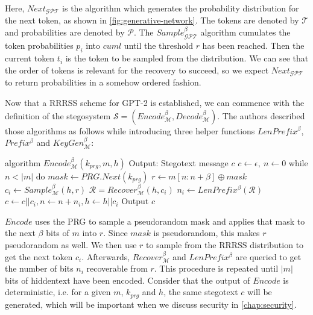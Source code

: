 Here, $Next_{\mathcal{GPT}}$ is the algorithm which generates the probability distribution for the next token, as shown in \autoref{fig:generative-network}.
The tokens are denoted by $\mathcal{T}$ and probabilities are denoted by $\mathcal{P}$.
The $Sample_{\mathcal{GPT}}^\beta$ algorithm cumulates the token probabilities $p_i$ into $cuml$ until the threshold $r$ has been reached.
Then the current token $t_i$ is the token to be sampled from the distribution.
We can see that the order of tokens is relevant for the recovery to succeed, so we expect $Next_{\mathcal{GPT}}$ to return probabilities in a somehow ordered fashion.

Now that a RRRSS scheme for GPT-2 is established, we can commence with the definition of the stegosystem $\mathcal{S} = \left( Encode_{\mathcal{M}}^\beta, Decode_{\mathcal{M}}^\beta \right)$.
The authors described those algorithms as follows while introducing three helper functions $LenPrefix^\beta$, $Prefix^\beta$ and $KeyGen_{\mathcal{M}}^\beta$:


\begin{Pseudocode}[caption={Meteor Encode Algorithm, \cite{Meteor2021}}, label={alg:encode}]
algorithm $Encode_{\mathcal{M}}^\beta(k_{prg}, m, h)$
	Output: Stegotext message $c$
	$c \leftarrow \epsilon,~ n \leftarrow 0$
	while $n < |m|$ do
		$mask \leftarrow PRG.Next(k_{prg})$
		$r \leftarrow m[n:n+\beta] \oplus mask$
		$c_i \leftarrow Sample_{\mathcal{M}}^\beta(h, r)$
		$\mathcal{R} = Recover_{\mathcal{M}}^\beta(h, c_i)$
		$n_i \leftarrow LenPrefix^\beta(\mathcal{R})$
		$c \leftarrow c || c_i, n \leftarrow n+n_i, h \leftarrow h||c_i$
	Output $c$
\end{Pseudocode}

$Encode$ uses the PRG to sample a pseudorandom mask and applies that mask to the next $\beta$ bits of $m$ into $r$.
Since $mask$ is pseudorandom, this makes $r$ pseudorandom as well.
We then use $r$ to sample from the RRRSS distribution to get the next token $c_i$.
Afterwards, $Recover_{\mathcal{M}}^\beta$ and $LenPrefix^\beta$ are queried to get the number of bits $n_i$ recoverable from $r$.
This procedure is repeated until $|m|$ bits of hiddentext have been encoded.
Consider that the output of $Encode$ is deterministic, i.e. for a given $m$, $k_{prg}$ and $h$, the same stegotext $c$ will be generated, which will be important when we discuss security in \autoref{chap:security}. 


